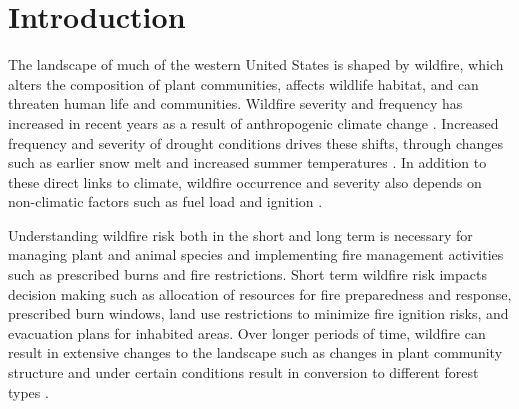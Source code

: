 \documentclass[11p]{article}
\begin{document}


\section{Introduction}

The landscape of much of the western United States is shaped by wildfire, which alters the composition of plant communities, affects wildlife habitat, and can threaten human life and communities. Wildfire severity and frequency has increased in recent years as a result of anthropogenic climate change \citep{abatzoglouImpactAnthropogenicClimate2016,runningGlobalWarmingCausing2006,boerChangingWeatherExtremes2017,littellReviewRelationshipsDrought2016}. Increased frequency and severity of drought conditions drives these shifts, through changes such as earlier snow melt \citep{tercekForecasts21stCentury2016} and increased summer temperatures \citep{runningGlobalWarmingCausing2006}. In addition to these direct links to climate, wildfire occurrence and severity also depends on non-climatic factors such as fuel load and ignition \citep{mckenzieClimateChangeEcohydrology2017}.

Understanding wildfire risk both in the short and long term is necessary for managing plant and animal species and implementing fire management activities such as prescribed burns and fire restrictions. Short term wildfire risk impacts decision making such as allocation of resources for fire preparedness and response, prescribed burn windows, land use restrictions to minimize fire ignition risks, and evacuation plans for inhabited areas. Over longer periods of time, wildfire can result in extensive changes to the landscape such as changes in plant community structure and under certain conditions result in conversion to different forest types \citep{coopWildfireDrivenForestConversion2020}.
\end{document}
